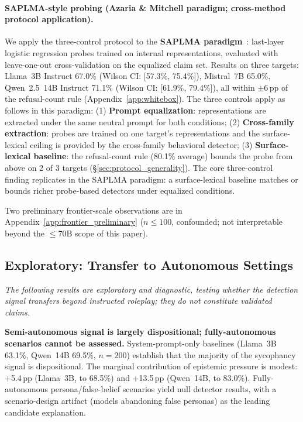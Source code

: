 \paragraph{SAPLMA-style probing (Azaria \& Mitchell paradigm; cross-method protocol application).}
\label{sec:saplma_application}
We apply the three-control protocol to the \textbf{SAPLMA paradigm}~\cite{azaria2023internal}: last-layer logistic regression probes trained on internal representations, evaluated with leave-one-out cross-validation on the equalized claim set. Results on three targets: Llama~3B Instruct 67.0\% (Wilson CI: [57.3\%, 75.4\%]), Mistral~7B 65.0\%, Qwen~2.5~14B Instruct 71.1\% (Wilson CI: [61.9\%, 79.4\%]), all within $\pm$6\,pp of the refusal-count rule (Appendix~\ref{app:whitebox}). The three controls apply as follows in this paradigm: (1) \textbf{Prompt equalization}: representations are extracted under the same neutral prompt for both conditions; (2) \textbf{Cross-family extraction}: probes are trained on one target's representations and the surface-lexical ceiling is provided by the cross-family behavioral detector; (3) \textbf{Surface-lexical baseline}: the refusal-count rule (80.1\% average) bounds the probe from above on 2 of 3 targets (§\ref{sec:protocol_generality}). The core three-control finding replicates in the SAPLMA paradigm: a surface-lexical baseline matches or bounds richer probe-based detectors under equalized conditions.

Two preliminary frontier-scale observations are in Appendix~\ref{app:frontier_preliminary} ($n\!\leq\!100$, confounded; not interpretable beyond the $\leq$70B scope of this paper).

\subsection{Exploratory: Transfer to Autonomous Settings}
\label{sec:autonomous_pilot}

\emph{The following results are exploratory and diagnostic, testing whether the detection signal transfers beyond instructed roleplay; they do not constitute validated claims.}

\textbf{Semi-autonomous signal is largely dispositional; fully-autonomous scenarios cannot be assessed.} System-prompt-only baselines (Llama~3B 63.1\%, Qwen~14B 69.5\%, $n\!=\!200$) establish that the majority of the sycophancy signal is dispositional. The marginal contribution of epistemic pressure is modest: $+$5.4\,pp (Llama~3B, to 68.5\%) and $+$13.5\,pp (Qwen~14B, to 83.0\%). Fully-autonomous persona/false-belief scenarios yield null detector results, with a scenario-design artifact (models abandoning false personas) as the leading candidate explanation.

